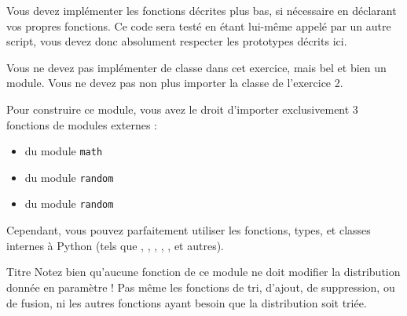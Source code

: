 

\vspace*{0.7cm}

\noindent {}

\bigskip

\noindent Vous devez implémenter les fonctions décrites plus bas, si nécessaire en déclarant vos propres fonctions.
Ce code sera testé en étant lui-même appelé par un autre script, vous devez donc absolument respecter les prototypes décrits ici.

\bigskip

\noindent Vous ne devez pas implémenter de classe dans cet exercice, mais bel et bien un module.
Vous ne devez pas non plus importer la classe de l'exercice 2.

\bigskip

\noindent Pour construire ce module, vous avez le droit d'importer exclusivement 3 fonctions de modules externes :

\begin{itemize}
\item {} du module \texttt{math}
\item {} du module \texttt{random}
\item {} du module \texttt{random}
\end{itemize}

\bigskip

\noindent Cependant, vous pouvez parfaitement utiliser les fonctions, types, et classes internes à Python (tels que , , , , , et autres).

\bigskip

\begin{RedBoxTitle}{Titre}
Notez bien qu'aucune fonction de ce module ne doit modifier la distribution donnée en paramètre !
Pas même les fonctions de tri, d'ajout, de suppression, ou de fusion, ni les autres fonctions ayant besoin que la distribution soit triée.
\end{RedBoxTitle}


